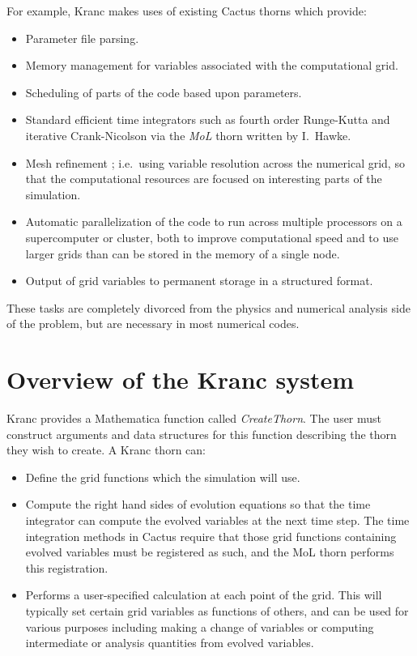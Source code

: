 \documentclass{report}
\begin{document}
For example, Kranc makes uses of existing Cactus thorns which provide:
\begin{itemize}
\item Parameter file parsing.
\item Memory management for variables associated with the
computational grid.
\item Scheduling of parts of the code based upon parameters.
\item Standard efficient time integrators such as fourth order
Runge-Kutta and iterative Crank-Nicolson via the {\em MoL} thorn
written by I.~Hawke.
\item Mesh refinement \cite{Schnetter}; i.e.~using variable resolution
across the numerical grid, so that the computational resources are
focused on interesting parts of the simulation.
\item Automatic parallelization of the code to run across multiple
processors on a supercomputer or cluster, both to improve
computational speed and to use larger grids than can be stored in the
memory of a single node.
\item Output of grid variables to permanent storage in a structured
format.
\end{itemize}
These tasks are completely divorced from the physics and numerical
analysis side of the problem, but are necessary in most numerical
codes.  

\section{Overview of the Kranc system}

Kranc provides a Mathematica function called {\em CreateThorn}.  The
user must construct arguments and data structures for this function
describing the thorn they wish to create.  A Kranc thorn can:

\begin{itemize}
\item Define the grid functions which the simulation will use.
\item Compute the right hand sides of evolution equations so that the
time integrator can compute the evolved variables at the next time
step.  The time integration methods in Cactus require that those grid
functions containing evolved variables must be registered as such, and
the MoL thorn performs this registration.
\item Performs a user-specified calculation at each point of the grid.
This will typically set certain grid variables as functions of others,
and can be used for various purposes including making a change of
variables or computing intermediate or analysis quantities from
evolved variables.
\end{itemize}
\end{document}
